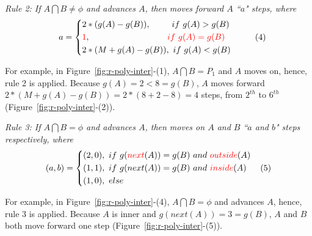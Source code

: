 \sstab \emph{Rule 2: 
If $A \bigcap B \ne \phi$ and advances $A$, then moves forward $A$ ``$a$" steps, where}
\vspace{-1ex}
\begin{equation*}
\label{equ-rule2}
\small
    \hspace{2ex} a =  \left\{
    \begin{aligned}
        & 2*(g(A) - g(B)),  \hspace{5ex} ~if  ~g(A) > g(B) \\
        & \textcolor[rgb]{1.00,0.00,0.00}{1}, \hspace{21ex}\textcolor[rgb]{1.00,0.00,0.00}{if  ~g(A) = g(B)} \\
        & 2*(M+g(A) - g(B)), ~if  ~g(A) < g(B) \\
    \end{aligned}
    \right.       \hspace{6ex}(4)
\end{equation*}
\vspace{-1ex}


For example, in Figure~\ref{fig:r-poly-inter}-(1), $A \bigcap B = P_1$ and $A$ moves on, hence, rule 2 is applied. Because $g(A)=2 < 8=g(B)$, $A$ moves forward $2*(M+g(A) - g(B)) = 2*(8+2-8)= 4$ steps, \ie from $2^{th}$ to $6^{th}$ (Figure~\ref{fig:r-poly-inter}-(2)).



\sstab \emph{Rule 3: 
If $A \bigcap B = \phi$ and advances $A$, then moves on $A$ and $B$ ``$a$ and $b$" steps respectively, where}
\vspace{-1ex}
\begin{equation*}
\label{equ-rule3}
\small
    \hspace{0ex} (a,b) =  \left\{
    \begin{aligned}
        & (2,0), ~if~ g(\textcolor[rgb]{1.00,0.00,0.00}{next}(A)) = g(B) ~and~ \textcolor[rgb]{1.00,0.00,0.00}{outside}(A)  \\
        & (1,1), ~if~ g(next(A)) = g(B) ~and~ \textcolor[rgb]{1.00,0.00,0.00}{inside}(A)\\
        & (1,0), ~else
    \end{aligned}
    \right.       \hspace{2ex}(5)
\end{equation*}
\vspace{-1ex}

For example, in Figure~\ref{fig:r-poly-inter}-(4), $A \bigcap B = \phi$ and advances $A$, hence, rule 3 is applied. Because $A$ is inner and $g(next(A))=3 = g(B)$, $A$ and $B$ both move forward one step (Figure~\ref{fig:r-poly-inter}-(5)).



